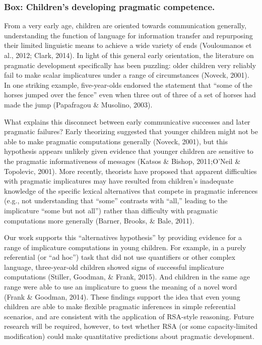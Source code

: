\documentclass[]{elsarticle}
\begin{document}
\subsubsection{Box: Children's developing pragmatic competence.
}\label{box-childrens-developing-pragmatic-competence.}

From a very early age, children are oriented towards communication
generally, understanding the function of language for information
transfer and repurposing their limited linguistic means to achieve a
wide variety of ends (Vouloumanos et al., 2012; Clark, 2014). In light
of this general early orientation, the literature on pragmatic
development specifically has been puzzling: older children very reliably
fail to make scalar implicatures under a range of circumstances (Noveck,
2001). In one striking example, five-year-olds endorsed the statement
that ``some of the horses jumped over the fence'' even when three out of
three of a set of horses had made the jump (Papafragou \& Musolino,
2003).

What explains this disconnect between early communicative successes and
later pragmatic failures? Early theorizing suggested that younger
children might not be able to make pragmatic computations generally
(Noveck, 2001), but this hypothesis appears unlikely given evidence that
younger children are sensitive to the pragmatic informativeness of
messages (Katsos \& Bishop, 2011;O'Neil \& Topolevic, 2001). More
recently, theorists have proposed that apparent difficulties with
pragmatic implicatures may have resulted from children's inadequate
knowledge of the specific lexical alternatives that compete in pragmatic
inferences (e.g., not understanding that ``some'' contrasts with
``all,'' leading to the implicature ``some but not all'') rather than
difficulty with pragmatic computations more generally (Barner, Brooks,
\& Bale, 2011).

Our work supports this ``alternatives hypothesis'' by providing evidence
for a range of implicature computations in young children. For example,
in a purely referential (or ``ad hoc'') task that did not use
quantifiers or other complex language, three-year-old children showed
signs of successful implicature computations (Stiller, Goodman, \&
Frank, 2015). And children in the same age range were able to use an
implicature to guess the meaning of a novel word (Frank \& Goodman,
2014). These findings support the idea that even young children are able
to make flexible pragmatic inferences in simple referential scenarios,
and are consistent with the application of RSA-style reasoning. Future
research will be required, however, to test whether RSA (or some
capacity-limited modification) could make quantitative predictions about
pragmatic development.
\end{document}
